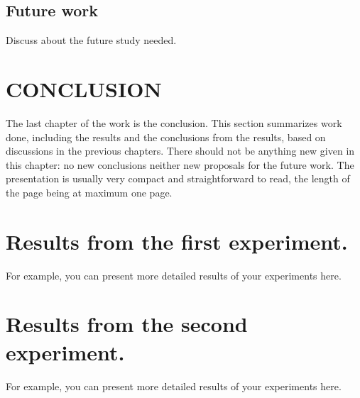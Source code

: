 \documentclass{lutmscthesis}[2017/10/03]
\begin{document}
\subsection{Future work}

Discuss about the future study needed.

\section{CONCLUSION}
\label{sec:conclusion}

The last chapter of the work is the conclusion. 
This section summarizes work done, including the results and the conclusions from the results, 
based on discussions in the previous chapters. 
There should not be anything new given in this chapter: 
no new conclusions neither new proposals for the future work.
The presentation is usually very compact and straightforward to read, 
the length of the page being at maximum one page.   
 
\clearpage






\appendix
 
\section{Results from the first experiment.}
\label{app:results1}

For example, you can present more detailed results of your experiments here. 

\newpage 

\section{Results from the second experiment.}
\label{app:results2}

For example, you can present more detailed results of your experiments here.
\end{document}
